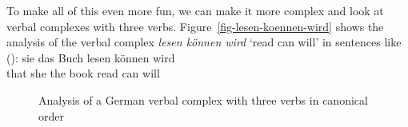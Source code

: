 To make all of this even more fun, we can make it more complex and look at verbal complexes with
three verbs. Figure~\vref{fig-lesen-koennen-wird} shows the analysis of the verbal complex \emph{lesen können wird} `read
can will' in sentences like ():
\ea
\label{ex-lesen-koennen-wird}
\gll [dass] sie das Buch lesen können wird\\
     \spacebr{}that she the book read can will\\
\z

\begin{figure}
\caption{\label{fig-lesen-koennen-wird}Analysis of a German verbal complex with three verbs in canonical order}
\end{figure}

